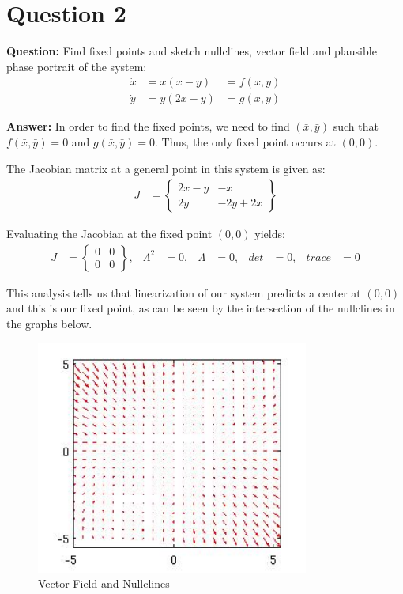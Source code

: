 \documentclass[12pt]{article}
\newenvironment{myenv}{\begin{adjustwidth}{1cm}{}}{\end{adjustwidth}}
\begin{document}
\section*{Question 2}
\begin{myenv}
\textbf{Question:} Find fixed points and sketch nullclines, vector field and plausible phase portrait of the system:
\begin{alignat*}{3}
\dot{x} &= x(x-y) &= f(x,y) \\
\dot{y} &= y(2x-y) &= g(x,y)
\end{alignat*}


\textbf{Answer:} In order to find the fixed points, we need to find $(\bar{x},\bar{y})$ such that $f(\bar{x},\bar{y}) = 0$ and $g(\bar{x},\bar{y}) = 0$. Thus, the only fixed point occurs at $(0,0)$.

The Jacobian matrix at a general point in this system is given as:
\begin{align*}
	J &= 
	\begin{Bmatrix}
	2x-y & -x \\
	2y & -2y + 2x
	\end{Bmatrix}
\end{align*}

Evaluating the Jacobian at the fixed point $(0,0)$ yields:
\begin{align*}
	J &= 
	\begin{Bmatrix}
	0 & 0 \\
	0 & 0
	\end{Bmatrix}, 	&\Lambda^2 &= 0,	&\Lambda &= 0, &det &= 0, &trace &= 0
\end{align*}


This analysis tells us that linearization of our system predicts a center at $(0,0)$ and this is our fixed point, as can be seen by the intersection of the nullclines in the graphs below.



\begin{figure} [H]
    \centering
    \includegraphics[width=0.8\textwidth]{Question2_VectorField}
    \caption{ Vector Field and Nullclines}
    \label{figure:a0}
\end{figure}



\end{myenv}
\end{document}
